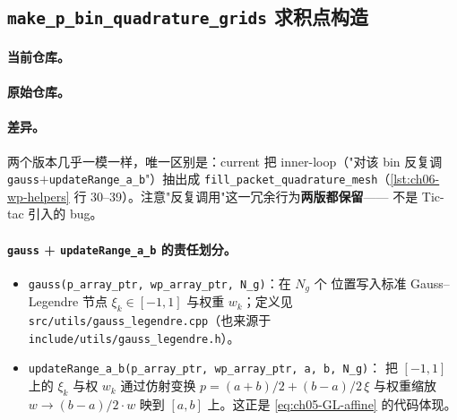 \subsection{\texttt{make\_p\_bin\_quadrature\_grids} 求积点构造}
\label{subsec:ch06-code-quadgrids}

\paragraph{当前仓库。}


\paragraph{原始仓库。}


\paragraph{差异。}
两个版本几乎一模一样，唯一区别是：current 把 inner-loop（"对该 bin
反复调 \texttt{gauss}\(+\)\texttt{updateRange\_a\_b}"）抽出成
\texttt{fill\_packet\_quadrature\_mesh}（\cref{lst:ch06-wp-helpers} 行
30--39）。注意"反复调用"这一冗余行为\textbf{两版都保留}——
不是 Tic-tac 引入的 bug。

\paragraph{\texttt{gauss} + \texttt{updateRange\_a\_b} 的责任划分。}
\begin{itemize}
  \item \texttt{gauss(p\_array\_ptr, wp\_array\_ptr, N\_g)}：在 \(N_g\) 个
        位置写入标准 Gauss--Legendre 节点 \(\xi_k \in [-1, 1]\) 与权重
        \(w_k\)；定义见 \texttt{src/utils/gauss\_legendre.cpp}（也来源于
        \texttt{include/utils/gauss\_legendre.h}）。
  \item \texttt{updateRange\_a\_b(p\_array\_ptr, wp\_array\_ptr, a, b, N\_g)}：
        把 \([-1, 1]\) 上的 \(\xi_k\) 与权 \(w_k\) 通过仿射变换 \(p =
        (a+b)/2 + (b-a)/2\,\xi\) 与权重缩放 \(w \to (b-a)/2 \cdot w\)
        映到 \([a, b]\) 上。这正是 \cref{eq:ch05-GL-affine} 的代码体现。
\end{itemize}

